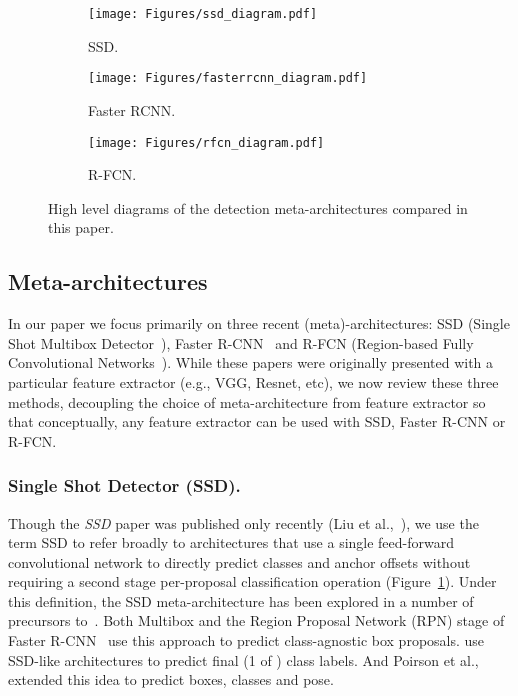 \documentclass[10pt,twocolumn,letterpaper]{article}
\renewcommand{\paragraph}[1]{\subsubsection{#1}}
\begin{document}
\begin{figure*}[t!]
\begin{center}
\begin{subfigure}[t]{0.3\linewidth}
  \texttt{[image: Figures/ssd\_diagram.pdf]}
  \caption{SSD.}
\label{fig:ssd_diagram}
\end{subfigure}
\begin{subfigure}[t]{0.3\linewidth}
  \texttt{[image: Figures/fasterrcnn\_diagram.pdf]}
  \caption{Faster RCNN.}
\label{fig:fasterrcnn_diagram}
\end{subfigure}
\begin{subfigure}[t]{0.3\linewidth}
  \texttt{[image: Figures/rfcn\_diagram.pdf]}
  \caption{R-FCN.}
\label{fig:rfcn_diagram}
\end{subfigure}
\caption{
High level diagrams of the detection meta-architectures compared in this paper.
}
\end{center}
\end{figure*}



\subsection{Meta-architectures}\vspace{-2mm}
In our paper we focus primarily on three recent  (meta)-architectures: SSD (Single Shot Multibox Detector~\cite{liu2015ssd}), Faster R-CNN~\cite{ren2015faster} and R-FCN (Region-based Fully Convolutional Networks~\cite{dai2016r}).
While these papers were originally presented with a particular feature extractor (e.g., VGG, Resnet, etc), we now review these three methods, decoupling the choice of meta-architecture from feature extractor so that conceptually, any feature extractor can be used with SSD, Faster R-CNN or R-FCN.
\vspace{-3mm}
\paragraph{Single Shot Detector (SSD).}
Though the \emph{SSD} paper was published only recently (Liu et al.,~\cite{liu2015ssd}),
we use the term SSD to refer broadly to architectures that use a single feed-forward
convolutional network to directly predict classes
and anchor offsets without requiring a second stage per-proposal classification operation
(Figure~\ref{fig:ssd_diagram}).  Under this definition, the SSD meta-architecture has been explored in a number of precursors to~\cite{liu2015ssd}. Both Multibox and the Region Proposal Network (RPN) stage of Faster R-CNN~\cite{szegedy2014scalable,ren2015faster} use this approach to predict class-agnostic box proposals.  \cite{sermanet2013overfeat,redmon2015you,redmon2016yolo9000,fu2017dssd} use SSD-like architectures to predict final (1 of ) class labels.  And Poirson et al.,~\cite{poirson2016fast} extended this idea to predict boxes, classes and pose.
\end{document}
